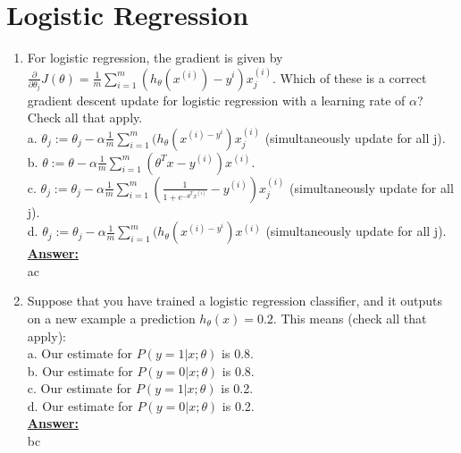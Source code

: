 \documentclass{article}
\newenvironment{qparts}{\begin{enumerate}[1.]}{\end{enumerate}}
\begin{document}
\newpage
\section{Logistic Regression}

\begin{qparts}
 \item For logistic regression, the gradient is given by $\frac{\partial }{\partial \theta_j } J(\theta) = \frac{1}{m} \sum_{i=1}^{m}(h_\theta(x^{(i)})-y^{i})x^{(i)}_j$. Which of these is a correct gradient descent update for logistic regression with a learning rate of $\alpha$? \\
 Check all that apply.\\
 a. $\theta_j := \theta_j - \alpha \frac{1}{m} \sum_{i=1}^m (h_\theta(x^{(i)-y^i}) x^{(i)}_j$ (simultaneously update for all j).\\
 b. $\theta := \theta - \alpha \frac{1}{m} \sum_{i=1}^m (\theta^Tx-y^{(i)}) x^{(i)}$.\\
 c. $\theta_j := \theta_j - \alpha \frac{1}{m} \sum_{i=1}^m \left(\frac{1}{1+e^{-\theta^Tx^{(i)}}}-y^{(i)}\right) x^{(i)}_j$ (simultaneously update for all j).\\
 d. $\theta_j := \theta_j - \alpha \frac{1}{m} \sum_{i=1}^m (h_\theta(x^{(i)-y^i}) x^{(i)}$ (simultaneously update for all j).\\
 
\underline{\textbf{Answer:}}\\
ac

 \item Suppose that you have trained a logistic regression classifier, and it outputs on a new example a prediction $h_\theta(x) = 0.2$. This means (check all that apply):\\
a. Our estimate for $P(y = 1|x; \theta)$ is 0.8.\\
b. Our estimate for $P(y = 0|x; \theta)$ is 0.8.\\
c. Our estimate for $P(y = 1|x; \theta)$ is 0.2.\\
d. Our estimate for $P(y = 0|x; \theta)$ is 0.2.\\
 
\underline{\textbf{Answer:}}\\
bc

\end{qparts}

\newpage
\end{document}

